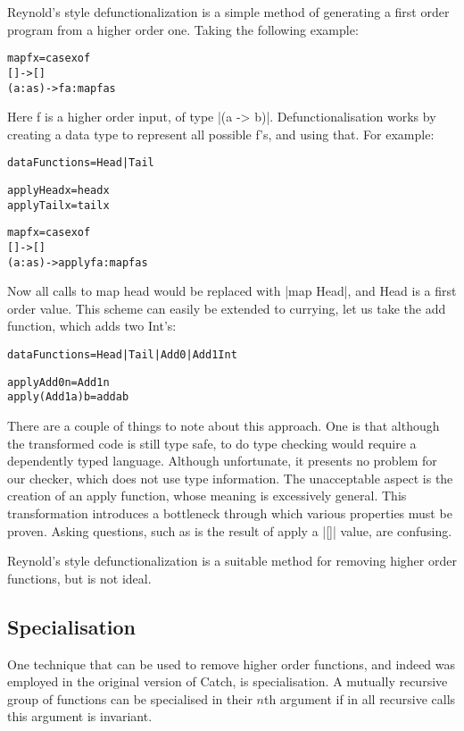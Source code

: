 \documentclass[preprint]{sigplanconf}
\newcommand{\C}[1]{\textsf{#1}}
\newenvironment{code}{\begin{alltt}\small}{\end{alltt}}
\begin{document}
Reynold's style defunctionalization \citep{reynolds:defunc} is a simple method of generating a first order program from a higher order one. Taking the following example:

\begin{code}
map f x = case  x of
                []      -> []
                (a:as)  -> f a : map f as
\end{code}

Here \C{f} is a higher order input, of type |(a -> b)|. Defunctionalisation works by creating a data type to represent all possible f's, and using that. For example:

\begin{code}
data Functions = Head | Tail

apply Head  x = head  x
apply Tail  x = tail  x

map f x = case  x of
                []      -> []
                (a:as)  -> apply f a : map f as
\end{code}

Now all calls to map head would be replaced with |map Head|, and \C{Head} is a first order value. This scheme can easily be extended to currying, let us take the \C{add} function, which adds two \C{Int}'s:

\begin{code}
data Functions = Head | Tail | Add0 | Add1 Int

apply Add0      n  = Add1 n
apply (Add1 a)  b  = add a b
\end{code}

There are a couple of things to note about this approach. One is that although the transformed code is still type safe, to do type checking would require a dependently typed language. Although unfortunate, it presents no problem for our checker, which does not use type information. The unacceptable aspect is the creation of an apply function, whose meaning is excessively general. This transformation introduces a bottleneck through which various properties must be proven. Asking questions, such as is the result of \C{apply} a |[]| value, are confusing.

Reynold's style defunctionalization is a suitable method for removing higher order functions, but is not ideal.

\subsection{Specialisation}

One technique that can be used to remove higher order functions, and indeed was employed in the original version of Catch, is specialisation. A mutually recursive group of functions can be specialised in their $n$th argument if in all recursive calls this
argument is invariant.
\end{document}
